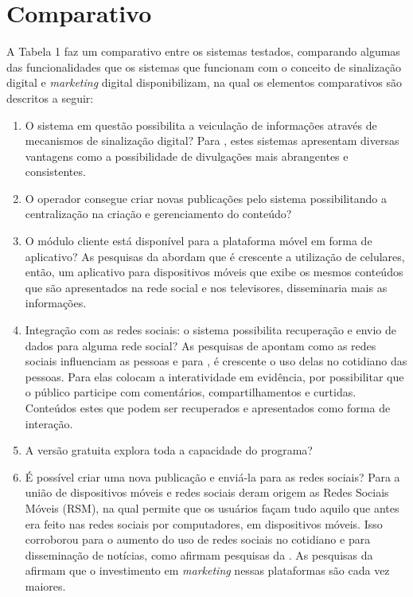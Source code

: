 \section{Comparativo}
A Tabela 1 faz um comparativo entre os sistemas testados, comparando algumas das funcionalidades que os sistemas que funcionam com o conceito de sinalização digital e \textit{marketing} digital disponibilizam, na qual os elementos comparativos são descritos a seguir:
\begin{enumerate}[label=\Roman*)]
	\item O sistema em questão possibilita a veiculação de informações através de mecanismos de sinalização digital? Para \cite{machado2010}, estes sistemas apresentam diversas vantagens como a possibilidade de divulgações mais abrangentes e consistentes.
	\item O operador consegue criar novas publicações pelo sistema possibilitando a centralização na criação e gerenciamento do conteúdo? 
	\item O módulo cliente está disponível para a plataforma móvel em forma de aplicativo? As pesquisas da \cite{emarketer} abordam que é crescente a utilização de celulares, então, um aplicativo para dispositivos móveis que exibe os mesmos conteúdos que são apresentados na rede social e nos televisores, disseminaria mais as informações.
	\item Integração com as redes sociais: o sistema possibilita recuperação e envio de dados para alguma rede social? As pesquisas de \cite{seo2017} apontam como as redes sociais influenciam as pessoas e para \cite{rosa2010}, é crescente o uso delas no cotidiano das pessoas. Para \cite{escobar2007} elas colocam a interatividade em evidência, por possibilitar que o público participe com comentários, compartilhamentos e curtidas. Conteúdos estes que podem ser recuperados e apresentados como forma de interação.
	\item A versão gratuita explora toda a capacidade do programa?
	\item É possível criar uma nova publicação e enviá-la para as redes sociais? Para \cite{teles2013} a união de dispositivos móveis e redes sociais deram origem as Redes Sociais Móveis (RSM), na qual permite que os usuários façam tudo aquilo que antes era feito nas redes sociais por computadores, em dispositivos móveis. Isso corroborou para o aumento do uso de redes sociais no cotidiano e para disseminação de notícias, como afirmam pesquisas da \cite{emarketer}. As pesquisas da \cite{emarketer2013} afirmam que o investimento em \textit{marketing} nessas plataformas são cada vez maiores.
\end{enumerate}

